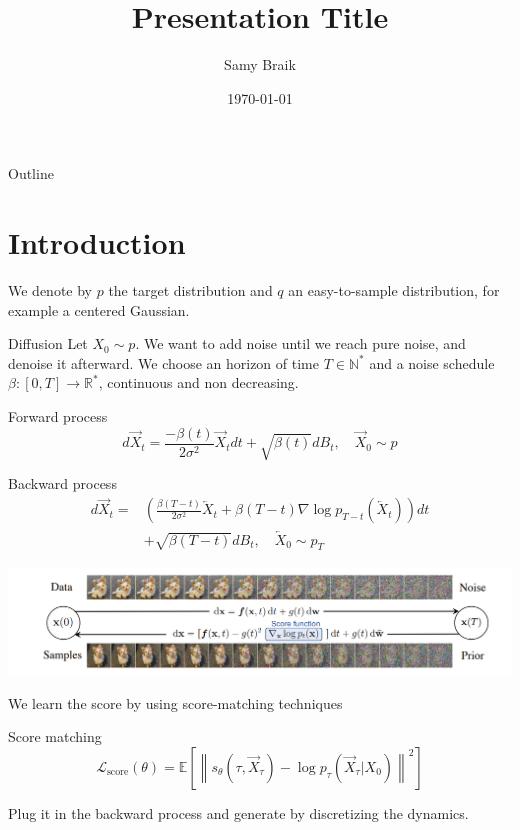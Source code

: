 \documentclass{beamer}
\title{Presentation Title}
\author{Samy Braik}
\date{\today}
\begin{document}
\begin{frame}
    \titlepage
\end{frame}

\begin{frame}{Outline}
    \tableofcontents
\end{frame}

\section{Introduction}

\begin{frame}
    We denote by \(p\) the target distribution and \(q\) an easy-to-sample distribution, for example a centered Gaussian.
\end{frame}

\begin{frame}{Diffusion}
    Let \(X_0\sim p\). We want to add noise until we reach pure noise, and denoise it afterward. We choose an horizon of time \(T\in\mathbb{N}^*\) and a noise schedule \(\beta:[0,T]\rightarrow\mathbb{R}^*\), continuous and non decreasing.

    \begin{block}{Forward process}
            \[d\overrightarrow{X}_t = \frac{-\beta(t)}{2\sigma^2}\overrightarrow{X}_t dt + \sqrt{\beta(t)}dB_t, \quad \overrightarrow{X}_0\sim p\]
    \end{block}

    \begin{block}{Backward process}
        \begin{align*}
            d\overrightarrow{X}_t=&\left(  \frac{\beta(T-t)}{2\sigma^2}\overleftarrow{X}_t+\beta(T-t)\nabla\log p_{T-t}\left(\overleftarrow{X}_t \right)  \right)dt \\ &+ \sqrt{\beta(T-t)}dB_t, \quad \overleftarrow{X}_0\sim p_T
        \end{align*}
            
    \end{block}
\end{frame}

\begin{frame}
    \includegraphics[width=1\linewidth]{score_based_dog.png}
    \bigskip

    We learn the score by using score-matching techniques
    \begin{block}{Score matching}
        \[\mathcal{L}_\text{score}(\theta)=\mathbb{E}\left[ \left\| s_\theta \left(\tau,\overrightarrow{X}_\tau \right)-\log p_\tau \left(\overrightarrow{X}_\tau|X_0 \right)\right\|^2  \right]   \]
    \end{block}
    Plug it in the backward process and generate by discretizing the dynamics.
\end{frame}
\end{document}
